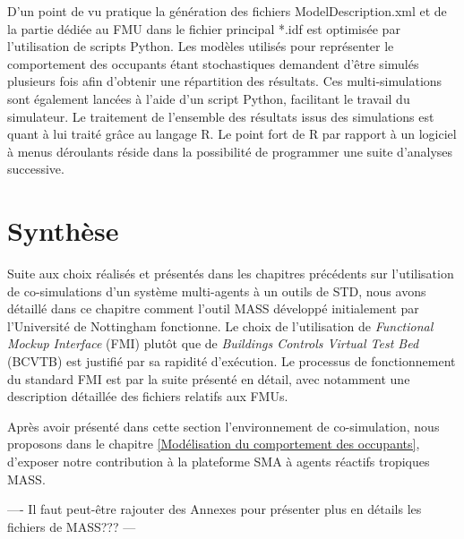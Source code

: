 D'un point de vu pratique la génération des fichiers ModelDescription.xml et de la partie dédiée au FMU dans le fichier principal *.idf est optimisée par l'utilisation de scripts Python. Les modèles utilisés pour représenter le comportement des occupants étant stochastiques demandent d'être simulés plusieurs fois afin d'obtenir une répartition des résultats. Ces multi-simulations sont également lancées à l'aide d'un script Python, facilitant le travail du simulateur. Le traitement de l'ensemble des résultats issus des simulations est quant à lui traité grâce au langage R. Le point fort de R par rapport à un logiciel à menus déroulants réside dans la possibilité de programmer une suite d'analyses successive.

\section{Synthèse}

Suite aux choix réalisés et présentés dans les chapitres précédents sur l'utilisation de co-simulations d'un système multi-agents à un outils de STD, nous avons détaillé dans ce chapitre comment l'outil MASS développé initialement par l'Université de Nottingham fonctionne. Le choix de l'utilisation de \textit{Functional Mockup Interface} (FMI) plutôt que de \textit{Buildings Controls Virtual Test Bed} (BCVTB) est justifié par sa rapidité d'exécution. Le processus de fonctionnement du standard FMI est par la suite présenté en détail, avec notamment une description détaillée des fichiers relatifs aux FMUs.

Après avoir présenté dans cette section l'environnement de co-simulation, nous proposons dans le chapitre \ref{Modélisation du comportement des occupants}, d'exposer notre contribution à la plateforme SMA à agents réactifs tropiques MASS.

---- Il faut peut-être rajouter des Annexes pour présenter plus en détails les fichiers de MASS??? ---